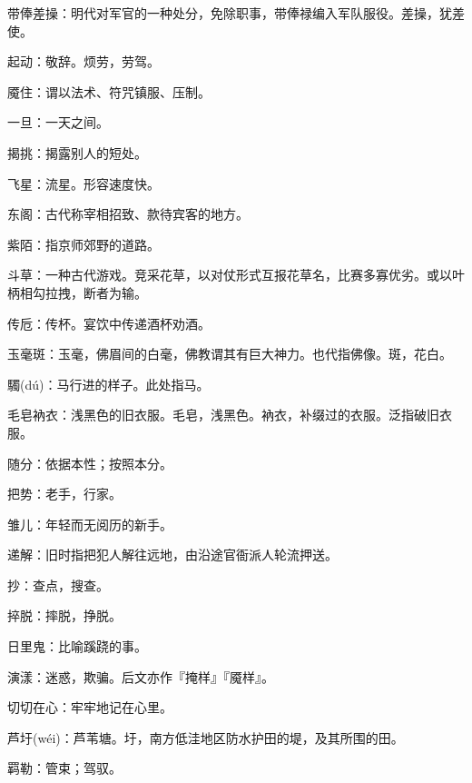 \startbuffer[1150]
带俸差操：明代对军官的一种处分，免除职事，带俸禄编入军队服役。差操，犹差使。
\stopbuffer


\startbuffer[1151]
起动：敬辞。烦劳，劳驾。
\stopbuffer


\startbuffer[1152]
魇住：谓以法术、符咒镇服、压制。
\stopbuffer


\startbuffer[1153]
一旦：一天之间。
\stopbuffer


\startbuffer[1154]
揭挑：揭露别人的短处。
\stopbuffer


\startbuffer[1155]
飞星：流星。形容速度快。
\stopbuffer


\startbuffer[1156]
东阁：古代称宰相招致、款待宾客的地方。
\stopbuffer


\startbuffer[1157]
紫陌：指京师郊野的道路。
\stopbuffer


\startbuffer[1158]
斗草：一种古代游戏。竞采花草，以对仗形式互报花草名，比赛多寡优劣。或以叶柄相勾拉拽，断者为输。
\stopbuffer


\startbuffer[1159]
传卮：传杯。宴饮中传递酒杯劝酒。
\stopbuffer


\startbuffer[1160]
玉毫斑：玉毫，佛眉间的白毫，佛教谓其有巨大神力。也代指佛像。斑，花白。
\stopbuffer


\startbuffer[1161]
䮷(dú)：马行进的样子。此处指马。
\stopbuffer


\startbuffer[1162]
毛皂衲衣：浅黑色的旧衣服。毛皂，浅黑色。衲衣，补缀过的衣服。泛指破旧衣服。
\stopbuffer


\startbuffer[1163]
随分：依据本性；按照本分。
\stopbuffer


\startbuffer[1164]
把势：老手，行家。
\stopbuffer


\startbuffer[1165]
雏儿：年轻而无阅历的新手。
\stopbuffer


\startbuffer[1166]
递解：旧时指把犯人解往远地，由沿途官衙派人轮流押送。
\stopbuffer


\startbuffer[1167]
抄：查点，搜查。
\stopbuffer


\startbuffer[1168]
捽脱：摔脱，挣脱。
\stopbuffer


\startbuffer[1169]
日里鬼：比喻蹊跷的事。
\stopbuffer


\startbuffer[1170]
演漾：迷惑，欺骗。后文亦作『掩样』『魇样』。
\stopbuffer


\startbuffer[1171]
切切在心：牢牢地记在心里。
\stopbuffer


\startbuffer[1172]
芦圩(wéi)：芦苇塘。圩，南方低洼地区防水护田的堤，及其所围的田。
\stopbuffer


\startbuffer[1173]
羁勒：管束；驾驭。
\stopbuffer


